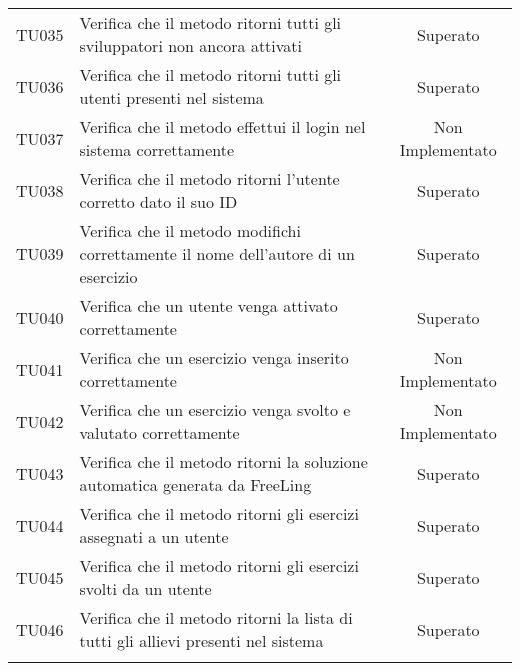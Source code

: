 \begin{tabularx}{\textwidth}{cXc}
		TU035 & Verifica che il metodo ritorni tutti gli sviluppatori non ancora attivati & Superato \\
		TU036 & Verifica che il metodo ritorni tutti gli utenti presenti nel sistema & Superato \\
		TU037 & Verifica che il metodo effettui il login nel sistema correttamente & Non Implementato \\
		TU038 & Verifica che il metodo ritorni l'utente corretto dato il suo ID & Superato \\
		TU039 & Verifica che il metodo modifichi correttamente il nome dell'autore di un esercizio & Superato \\
		TU040 & Verifica che un utente venga attivato correttamente & Superato \\
		TU041 & Verifica che un esercizio venga inserito correttamente & Non Implementato \\
		TU042 & Verifica che un esercizio venga svolto e valutato correttamente & Non Implementato \\
		TU043 & Verifica che il metodo ritorni la soluzione automatica generata da FreeLing & Superato \\
		TU044 & Verifica che il metodo ritorni gli esercizi assegnati a un utente & Superato \\
		TU045 & Verifica che il metodo ritorni gli esercizi svolti da un utente & Superato \\
		TU046 & Verifica che il metodo ritorni la lista di tutti gli allievi presenti nel sistema & Superato \\
		

\rowcolor{white}
\caption{Tabella requisiti di qualità} \label{tab:tabellarequisitiqualità}
\end{tabularx}
